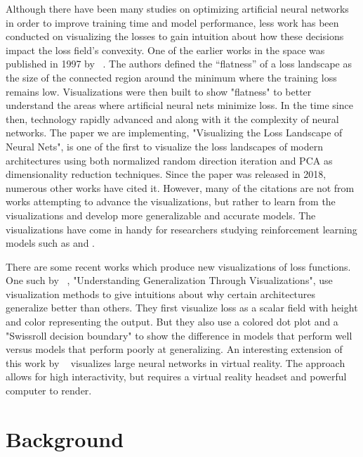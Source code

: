 \documentclass{acmsiggraph}
\begin{document}
Although there have been many studies on optimizing artificial neural networks in order to improve training time and model performance, less work has been conducted on visualizing the losses to gain intuition about how these decisions impact the loss field's convexity. One of the earlier works in the space was published in 1997 by ~\cite{hochreiter1997flat}. The authors defined the “flatness” of a loss landscape as the size of the connected region around the minimum where the training loss remains low. Visualizations were then built to show "flatness" to better understand the areas where artificial neural nets minimize loss. In the time since then, technology rapidly advanced and along with it the complexity of neural networks. The paper we are implementing, "Visualizing the Loss Landscape of Neural Nets", is one of the first to visualize the loss landscapes of modern architectures using both normalized random direction iteration and PCA as dimensionality reduction techniques. Since the paper was released in 2018, numerous other works have cited it. However, many of the citations are not from works attempting to advance the visualizations, but rather to learn from the visualizations and develop more generalizable and accurate models.
The visualizations have come in handy for researchers studying reinforcement learning models such as \cite{actor2020} and \cite{plaat2022deep}.

There are some recent works which produce new visualizations of loss functions. One such by ~\cite{pmlr-v137-huang20a}, "Understanding Generalization Through Visualizations", use
visualization methods to give intuitions about why certain architectures generalize better than others. They first visualize loss as a scalar field with height and color representing the output. But they also use a colored dot plot and a "Swissroll decision boundary" to show the difference in models that perform well versus models that perform poorly at generalizing. An interesting extension of this work by ~\cite{linse2022walk} visualizes large neural networks in virtual reality. The approach allows for high interactivity, but requires a virtual reality headset and powerful computer to render.

\section{Background}
\label{sec:intro}
\end{document}
